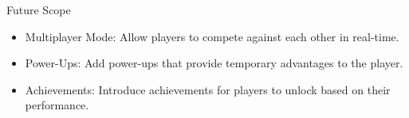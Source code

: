 \documentclass[pdf]{beamer}
\begin{document}
\begin{frame}{Future Scope}
    \begin{itemize}
        \item Multiplayer Mode: Allow players to compete against each other in real-time.
        \item Power-Ups: Add power-ups that provide temporary advantages to the player.
        \item Achievements: Introduce achievements for players to unlock based on 
        their performance.
    \end{itemize}
\end{frame}
\end{document}
